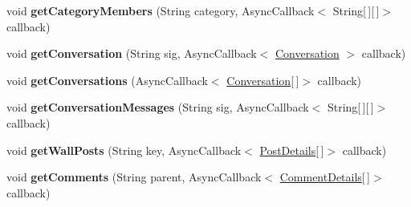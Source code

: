 \begin{DoxyCompactItemize}
\item 
\hypertarget{interfaceballmerpeak_1_1turtlenet_1_1client_1_1TurtlenetAsync_a79c59f68c6b1293bb55ba7f7f07bf83a}{void {\bfseries get\-Category\-Members} (String category, Async\-Callback$<$ String\mbox{[}$\,$\mbox{]}\mbox{[}$\,$\mbox{]}$>$ callback)}\label{interfaceballmerpeak_1_1turtlenet_1_1client_1_1TurtlenetAsync_a79c59f68c6b1293bb55ba7f7f07bf83a}

\item 
\hypertarget{interfaceballmerpeak_1_1turtlenet_1_1client_1_1TurtlenetAsync_a2e727bd389829fcebaad120ee7900180}{void {\bfseries get\-Conversation} (String sig, Async\-Callback$<$ \hyperlink{classballmerpeak_1_1turtlenet_1_1shared_1_1Conversation}{Conversation} $>$ callback)}\label{interfaceballmerpeak_1_1turtlenet_1_1client_1_1TurtlenetAsync_a2e727bd389829fcebaad120ee7900180}

\item 
\hypertarget{interfaceballmerpeak_1_1turtlenet_1_1client_1_1TurtlenetAsync_a90857a2008d7e5029c53234d13a3eb29}{void {\bfseries get\-Conversations} (Async\-Callback$<$ \hyperlink{classballmerpeak_1_1turtlenet_1_1shared_1_1Conversation}{Conversation}\mbox{[}$\,$\mbox{]}$>$ callback)}\label{interfaceballmerpeak_1_1turtlenet_1_1client_1_1TurtlenetAsync_a90857a2008d7e5029c53234d13a3eb29}

\item 
\hypertarget{interfaceballmerpeak_1_1turtlenet_1_1client_1_1TurtlenetAsync_af3d8302be17123744f088078aca3c8f1}{void {\bfseries get\-Conversation\-Messages} (String sig, Async\-Callback$<$ String\mbox{[}$\,$\mbox{]}\mbox{[}$\,$\mbox{]}$>$ callback)}\label{interfaceballmerpeak_1_1turtlenet_1_1client_1_1TurtlenetAsync_af3d8302be17123744f088078aca3c8f1}

\item 
\hypertarget{interfaceballmerpeak_1_1turtlenet_1_1client_1_1TurtlenetAsync_a6abffb3c7b3f85f6601f3df9c6bb5af9}{void {\bfseries get\-Wall\-Posts} (String key, Async\-Callback$<$ \hyperlink{classballmerpeak_1_1turtlenet_1_1shared_1_1PostDetails}{Post\-Details}\mbox{[}$\,$\mbox{]}$>$ callback)}\label{interfaceballmerpeak_1_1turtlenet_1_1client_1_1TurtlenetAsync_a6abffb3c7b3f85f6601f3df9c6bb5af9}

\item 
\hypertarget{interfaceballmerpeak_1_1turtlenet_1_1client_1_1TurtlenetAsync_a962d578b71c4bd469bd7e180c8c03ff9}{void {\bfseries get\-Comments} (String parent, Async\-Callback$<$ \hyperlink{classballmerpeak_1_1turtlenet_1_1shared_1_1CommentDetails}{Comment\-Details}\mbox{[}$\,$\mbox{]}$>$ callback)}\label{interfaceballmerpeak_1_1turtlenet_1_1client_1_1TurtlenetAsync_a962d578b71c4bd469bd7e180c8c03ff9}


\end{DoxyCompactItemize}

